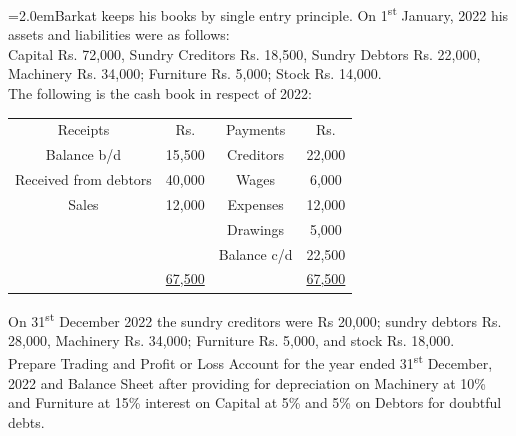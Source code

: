 \documentclass[11pt,a4paper]{article}
\newcommand{\lqn}[2]{\Needspace{6\baselineskip}\par\medskip\noindent\hangindent=2.0em\hangafter=1\makebox[2.0em][l]{\textbf{#1.}}#2\par}
\begin{document}
\lqn{12}{Barkat keeps his books by single entry principle. On 1\textsuperscript{st}  January, 2022 his assets and liabilities were as follows:\\
Capital Rs. 72,000, Sundry Creditors Rs. 18,500, Sundry Debtors Rs. 22,000, Machinery Rs. 34,000; Furniture Rs. 5,000; Stock Rs. 14,000.\\
The following is the cash book in respect of 2022:\par
\par\smallskip\noindent\hspace*{1.2em}\begin{tabular}{|cccc|}
\hline
Receipts & Rs. & Payments & Rs. \\
Balance b/d & 15,500 & Creditors & 22,000 \\
Received from debtors & 40,000 & Wages & 6,000 \\
Sales & 12,000 & Expenses & 12,000 \\
 &  & Drawings & 5,000 \\
 &  & Balance c/d & 22,500 \\
 & \underline{67,500} &  & \underline{67,500} \\
\hline
\end{tabular}\par\smallskip
On 31\textsuperscript{st}  December 2022 the sundry creditors were Rs 20,000; sundry debtors Rs. 28,000, Machinery Rs. 34,000; Furniture Rs. 5,000, and stock Rs. 18,000.\\
Prepare Trading and Profit or Loss Account for the year ended 31\textsuperscript{st}  December, 2022 and Balance Sheet after providing for depreciation on Machinery at 10\% and Furniture at 15\% interest on Capital at 5\% and 5\% on Debtors for doubtful debts.\par
}
\end{document}
